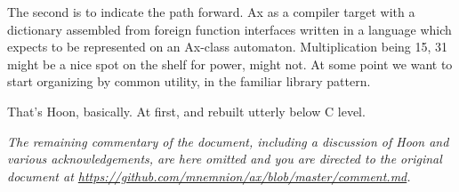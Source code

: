 \documentclass[twoside]{article}
\begin{document}
The second is to indicate the path forward. Ax as a compiler target with a dictionary assembled from foreign function interfaces written in a language which expects to be represented on an Ax-class automaton. Multiplication being 15, 31 might be a nice spot on the shelf for power, might not. At some point we want to start organizing by common utility, in the familiar library pattern.

That's Hoon, basically. At first, and rebuilt utterly below C level.

\emph{The remaining commentary of the document, including a discussion of Hoon and various acknowledgements, are here omitted and you are directed to the original document at \url{https://github.com/mnemnion/ax/blob/master/comment.md}.}

\end{document}
